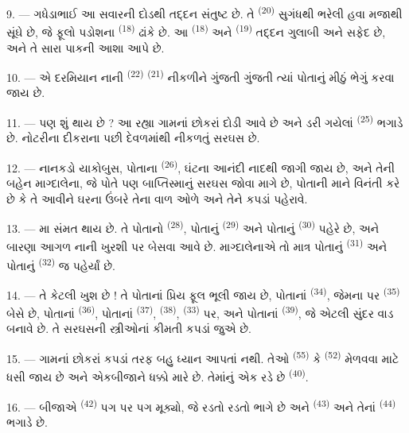 9. --- ગધેડાભાઈ આ સવારની દોડથી તદ્દન સંતુષ્ટ છે. તે
 \textsuperscript{(20)} સુગંધથી ભરેલી હવા મજાથી સૂંઘે
છે, જે ફૂલો પડોશના 
 \textsuperscript{(18)} ઢાંકે છે.
આ  \textsuperscript{(18)} અને 
\textsuperscript{(19)} તદ્દન ગુલાબી અને સફેદ છે, અને તે સારા પાકની આશા
આપે છે.

10. --- એ દરમિયાન નાની 
\textsuperscript{(22)}  \textsuperscript{(21)}
નીકળીને ગુંજતી ગુંજતી ત્યાં પોતાનું મીઠું  ભેગું કરવા
જાય છે.

11. --- પણ શું થાય છે ? આ રહ્યા ગામનાં છોકરાં દોડી આવે છે અને ડરી ગયેલાં
 \textsuperscript{(25)} ભગાડે છે. નોટરીના દીકરાના
 પછી દેવળમાંથી નીકળતું સરઘસ છે.

12. --- નાનકડો યાકોબુસ, પોતાના  \textsuperscript{(26)},
ઘંટના આનંદી નાદથી જાગી જાય છે, અને તેની બહેન માગ્દાલેના, જે પોતે પણ
બાપ્તિસ્માનું સરઘસ જોવા માગે છે, પોતાની માને વિનંતી કરે છે કે તે
આવીને ઘરના ઉંબરે તેના વાળ ઓળે અને તેને કપડાં પહેરાવે.

13. --- મા સંમત થાય છે. તે પોતાનો 
\textsuperscript{(28)}, પોતાનું  \textsuperscript{(29)}
અને પોતાનું  \textsuperscript{(30)} પહેરે છે, અને બારણા
આગળ નાની ખુરશી પર બેસવા આવે છે. માગ્દાલેનાએ તો માત્ર પોતાનું
 \textsuperscript{(31)} અને પોતાનું 
\textsuperscript{(32)} જ પહેર્યાં છે.

14. --- તે કેટલી ખુશ છે ! તે પોતાનાં પ્રિય ફૂલ ભૂલી જાય છે, પોતાનાં
 \textsuperscript{(34)}, જેમના પર 
\textsuperscript{(35)} બેસે છે, પોતાનાં 
\textsuperscript{(36)}, પોતાનાં 
\textsuperscript{(37)},  \textsuperscript{(38)},
 \textsuperscript{(33)} પર, અને પોતાનાં 
\textsuperscript{(39)}, જે એટલી સુંદર વાડ બનાવે છે. તે સરઘસની
સ્ત્રીઓનાં કીમતી કપડાં જુએ છે.

15. --- ગામનાં છોકરાં કપડાં તરફ બહુ ધ્યાન આપતાં નથી. તેઓ
 \textsuperscript{(55)} કે 
\textsuperscript{(52)} મેળવવા માટે ધસી જાય છે અને એકબીજાને ધક્કો મારે
છે. તેમાંનું એક રડે છે \textsuperscript{(40)}.

16. --- બીજાએ  \textsuperscript{(42)} પગ પર પગ મૂક્યો,
જે રડતો રડતો ભાગે છે અને  \textsuperscript{(43)} અને
તેનાં  \textsuperscript{(44)} ભગાડે છે.

